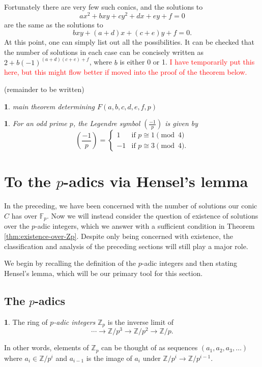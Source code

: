 \documentclass[10pt,a4paper]{amsart}
\numberwithin{equation}{section}
\numberwithin{figure}{section}
\theoremstyle{definition}
\theoremstyle{remark}
\theoremstyle{plain}
\newtheorem{thm}{\protect\theoremname}[section]
\theoremstyle{plain}
\theoremstyle{definition}
\newtheorem{defn}{\protect\definitionname}[section]
\theoremstyle{plain}
\newtheorem{prop}{\protect\propositionname}[section]
\theoremstyle{plain}
\providecommand{\definitionname}{Definition}
\providecommand{\propositionname}{Proposition}
\providecommand{\theoremname}{Theorem}
\newcommand{\legendre}[2]{\genfrac{(}{)}{}{}{#1}{#2}}
\newcommand{\F}{\mathbb{F}}
\newcommand{\Z}{\mathbb{Z}}
\begin{document}
    Fortunately there are very few such conics, and the solutions to 
    \[ ax^2 + bxy + cy^2 + dx + ey + f = 0 \] 
    are the same as the solutions to 
    \[ bxy + (a+d)x + (c+e)y + f = 0.  \] 
    At this point, one can simply list out all the
    possibilities. It can be checked that the number of solutions in each case can
    be concisely written as $2 + b(-1)^{(a+d)(c+e) + f}$, where $b$ is either 0 or
    1. \textcolor{red}{I have temporarily put this here, but this might flow better
    if moved into the proof of the theorem below. }

    (remainder to be written)

    \begin{thm} 
        main theorem determining $F(a,b,c,d,e,f,p)$ 
    \end{thm}

    \begin{prop} 
        For an odd prime $p$, the Legendre symbol $\legendre{-1}{p}$ is
        given by 
        \[ \legendre{-1}{p} = \begin{cases} 
            1 & \text{if } p \cong 1 \pmod 4 \\ 
            -1 & \text{if } p \cong 3 \pmod 4.  
        \end{cases} \]
    \end{prop}

    \section{To the $p$-adics via Hensel's lemma}
    \label{sec:hensels-lemma}
    
	In the preceding, we have been concerned with the number of solutions our conic $C$ has over $\F_p$. Now we will instead consider the question of existence of solutions over the $p$-adic integers, which we answer with a sufficient condition in Theorem \ref{thm:existence-over-Zp}. Despite only being concerned with existence, the classification and analysis of the preceding sections will still play a major role.
	
	We begin by recalling the definition of the $p$-adic integers and then stating Hensel's lemma, which will be our primary tool for this section.
	\subsection{The $p$-adics}
	\begin{defn}
		The ring of \emph{$p$-adic integers} $\Z_p$ is the inverse limit of
		\[
		\cdots \to \Z/p^3 \to \Z/p^2 \to \Z/p.
		\]
	\end{defn}
	In other words, elements of $\Z_p$ can be thought of as sequences $(a_1,a_2,a_3,\ldots)$ where $a_i \in \Z/p^i$ and $a_{i-1}$ is the image of $a_i$ under $\Z/p^i \to \Z/p^{i-1}$.
	
\end{document}
